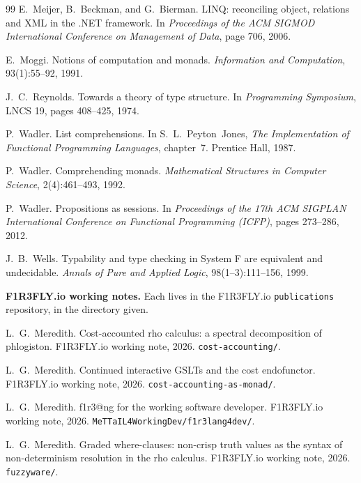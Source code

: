 \documentclass[11pt]{article}
\makeatletter
\theoremstyle{definition}
\theoremstyle{plain}
\theoremstyle{remark}
\newcommand{\flang}{\textsf{f1r3\textbar @ng}}
\makeatother
\begin{document}
\begin{thebibliography}{99}
E.~Meijer, B.~Beckman, and G.~Bierman.
\newblock LINQ: reconciling object, relations and XML in the .NET framework.
\newblock In \emph{Proceedings of the ACM SIGMOD International Conference on
Management of Data}, page 706, 2006.

E.~Moggi.
\newblock Notions of computation and monads.
\newblock \emph{Information and Computation}, 93(1):55--92, 1991.

J.~C.~Reynolds.
\newblock Towards a theory of type structure.
\newblock In \emph{Programming Symposium}, LNCS 19, pages 408--425, 1974.

P.~Wadler.
\newblock List comprehensions.
\newblock In S.~L.~Peyton~Jones, \emph{The Implementation of Functional
Programming Languages}, chapter~7. Prentice Hall, 1987.

P.~Wadler.
\newblock Comprehending monads.
\newblock \emph{Mathematical Structures in Computer Science}, 2(4):461--493,
1992.

P.~Wadler.
\newblock Propositions as sessions.
\newblock In \emph{Proceedings of the 17th ACM SIGPLAN International Conference
on Functional Programming (ICFP)}, pages 273--286, 2012.

J.~B.~Wells.
\newblock Typability and type checking in System F are equivalent and
undecidable.
\newblock \emph{Annals of Pure and Applied Logic}, 98(1--3):111--156, 1999.

\bigskip
\noindent\textbf{F1R3FLY.io working notes.} Each lives in the F1R3FLY.io
\texttt{publications} repository, in the directory given.

L.~G.~Meredith.
\newblock Cost-accounted rho calculus: a spectral decomposition of phlogiston.
\newblock F1R3FLY.io working note, 2026. \texttt{cost-accounting/}.

L.~G.~Meredith.
\newblock Continued interactive GSLTs and the cost endofunctor.
\newblock F1R3FLY.io working note, 2026. \texttt{cost-accounting-as-monad/}.

L.~G.~Meredith.
\newblock \flang{} for the working software developer.
\newblock F1R3FLY.io working note, 2026.
\texttt{MeTTaIL4WorkingDev/f1r3lang4dev/}.

L.~G.~Meredith.
\newblock Graded where-clauses: non-crisp truth values as the syntax of
non-determinism resolution in the rho calculus.
\newblock F1R3FLY.io working note, 2026. \texttt{fuzzyware/}.


\end{thebibliography}
\end{document}
